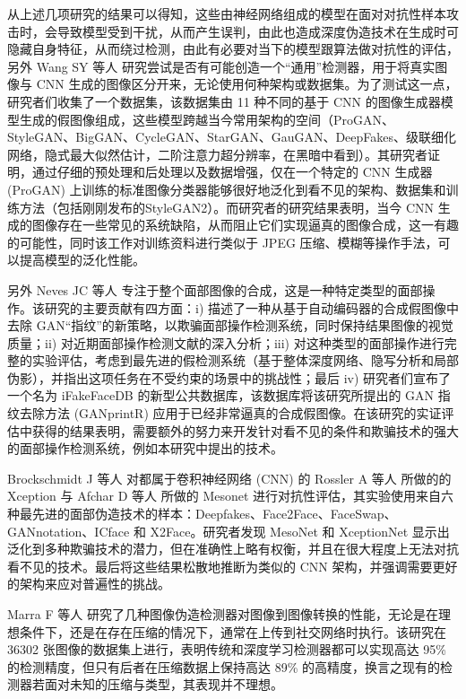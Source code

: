 从上述几项研究的结果可以得知，这些由神经网络组成的模型在面对对抗性样本攻击时，会导致模型受到干扰，从而产生误判，由此也造成深度伪造技术在生成时可隐藏自身特征，从而绕过检测，由此有必要对当下的模型跟算法做对抗性的评估，另外 Wang SY 等人 \cite{kurakin2018adversarial} 研究尝试是否有可能创造一个“通用”检测器，用于将真实图像与 CNN 生成的图像区分开来，无论使用何种架构或数据集。为了测试这一点，研究者们收集了一个数据集，该数据集由 11 种不同的基于 CNN 的图像生成器模型生成的假图像组成，这些模型跨越当今常用架构的空间（ProGAN、StyleGAN、BigGAN、CycleGAN、StarGAN、GauGAN、DeepFakes、级联细化网络，隐式最大似然估计，二阶注意力超分辨率，在黑暗中看到）。其研究者证明，通过仔细的预处理和后处理以及数据增强，仅在一个特定的 CNN 生成器 (ProGAN) 上训练的标准图像分类器能够很好地泛化到看不见的架构、数据集和训练方法（包括刚刚发布的StyleGAN2）。而研究者的研究结果表明，当今 CNN 生成的图像存在一些常见的系统缺陷，从而阻止它们实现逼真的图像合成，这一有趣的可能性，同时该工作对训练资料进行类似于 JPEG 压缩、模糊等操作手法，可以提高模型的泛化性能。

另外 Neves JC 等人 \cite{neves2020ganprintr} 专注于整个面部图像的合成，这是一种特定类型的面部操作。该研究的主要贡献有四方面：i) 描述了一种从基于自动编码器的合成假图像中去除 GAN“指纹”的新策略，以欺骗面部操作检测系统，同时保持结果图像的视觉质量；ii) 对近期面部操作检测文献的深入分析；iii) 对这种类型的面部操作进行完整的实验评估，考虑到最先进的假检测系统（基于整体深度网络、隐写分析和局部伪影），并指出这项任务在不受约束的场景中的挑战性；最后 iv) 研究者们宣布了一个名为 iFakeFaceDB 的新型公共数据库，该数据库将该研究所提出的 GAN 指纹去除方法 (GANprintR) 应用于已经非常逼真的合成假图像。在该研究的实证评估中获得的结果表明，需要额外的努力来开发针对看不见的条件和欺骗技术的强大的面部操作检测系统，例如本研究中提出的技术。

Brockschmidt J 等人 \cite{brockschmidt2019generality} 
对都属于卷积神经网络 (CNN) 的 Rossler A 等人 \cite{rossler2019faceforensics++} 所做的的 Xception 与 Afchar D 等人 \cite{afchar2018mesonet} 所做的 Mesonet 进行对抗性评估，其实验使用来自六种最先进的面部伪造技术的样本：Deepfakes、Face2Face、FaceSwap、GANnotation、ICface 和 X2Face。研究者发现 MesoNet 和 XceptionNet 显示出泛化到多种欺骗技术的潜力，但在准确性上略有权衡，并且在很大程度上无法对抗看不见的技术。最后将这些结果松散地推断为类似的 CNN 架构，并强调需要更好的架构来应对普遍性的挑战。

Marra F 等人 \cite{marra2018detection} 研究了几种图像伪造检测器对图像到图像转换的性能，无论是在理想条件下，还是在存在压缩的情况下，通常在上传到社交网络时执行。该研究在 36302 张图像的数据集上进行，表明传统和深度学习检测器都可以实现高达 95\% 的检测精度，但只有后者在压缩数据上保持高达 89\% 的高精度，换言之现有的检测器若面对未知的压缩与类型，其表现并不理想。

